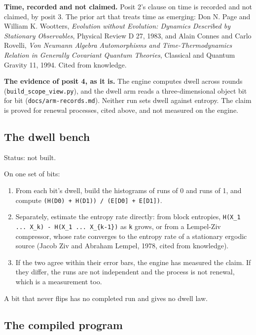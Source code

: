 \textbf{Time, recorded and not claimed.} Posit 2's clause on time is recorded and not claimed, by posit 3. The prior art that treats time as emerging: Don N. Page and William K. Wootters, \emph{Evolution without Evolution: Dynamics Described by Stationary Observables}, Physical Review D 27, 1983, and Alain Connes and Carlo Rovelli, \emph{Von Neumann Algebra Automorphisms and Time-Thermodynamics Relation in Generally Covariant Quantum Theories}, Classical and Quantum Gravity 11, 1994. Cited from knowledge.

\textbf{The evidence of posit 4, as it is.} The engine computes dwell across rounds (\texttt{build\_\allowbreak{}scope\_\allowbreak{}view.\allowbreak{}py}), and the dwell arm reads a three-dimensional object bit for bit (\texttt{docs/\allowbreak{}arm-\allowbreak{}records.\allowbreak{}md}). Neither run sets dwell against entropy. The claim is proved for renewal processes, cited above, and not measured on the engine.

\subsection{\texorpdfstring{The dwell bench}{The dwell bench}}

Status: not built.

On one set of bits:

\begin{enumerate}
\item From each bit's dwell, build the histograms of runs of 0 and runs of 1, and compute \texttt{(H(D0) + H(D1)) /\allowbreak{} (E[D0] + E[D1])}.
\item Separately, estimate the entropy rate directly: from block entropies, \texttt{H(X\_\allowbreak{}1 .\allowbreak{}.\allowbreak{}.\allowbreak{} X\_\allowbreak{}k) -\allowbreak{} H(X\_\allowbreak{}1 .\allowbreak{}.\allowbreak{}.\allowbreak{} X\_\allowbreak{}\{k-\allowbreak{}1\})} as \texttt{k} grows, or from a Lempel-Ziv compressor, whose rate converges to the entropy rate of a stationary ergodic source (Jacob Ziv and Abraham Lempel, 1978, cited from knowledge).
\item If the two agree within their error bars, the engine has measured the claim. If they differ, the runs are not independent and the process is not renewal, which is a measurement too.
\end{enumerate}

A bit that never flips has no completed run and gives no dwell law.

\subsection{\texorpdfstring{The compiled program}{The compiled program}}

